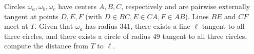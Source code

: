 Circles $\omega_a, \omega_b, \omega_c$ have centers $A, B, C$, respectively and are pairwise externally tangent at points $D, E, F$ (with $D\in BC, E\in CA, F\in AB$). Lines $BE$ and $CF$ meet at $T$. Given that $\omega_a$ has radius $341$, there exists a line $\ell$ tangent to all three circles, and there exists a circle of radius $49$ tangent to all three circles, compute the distance from $T$ to $\ell$.

